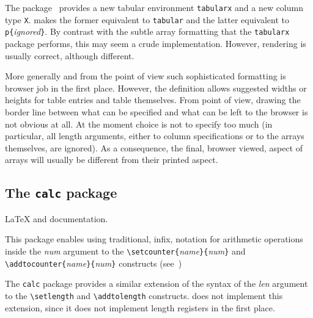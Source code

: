 The 
package~\cite[Section~5.3.5]{latexbis} provides a new tabular
environment \verb+tabularx+ and a new column type \verb+X+. \hevea{}
makes the former equivalent to \verb+tabular+ and the latter
equivalent to \verb+p{+\textit{ignored}\verb+}+.  By contrast with the
subtle array formatting that the \texttt{tabularx} package performs,
this may seem a crude implementation.  However, rendering is usually
correct, although different.

More generally and from the \html{} point of view such sophisticated
formatting is browser job in the first place.
However, the \html{} definition allows suggested widths or heights for
table entries and table themselves.
From \hevea{} point of view, drawing the border line between what can be
specified and what can be left to the browser is not obvious at all.
At the moment \hevea{} choice is not to specify too much (in
particular, all length
arguments, either to column specifications or to the arrays
themselves, are ignored). As a consequence, the final, browser viewed,
aspect of arrays will usually be different from their printed
aspect.

\subsection{The \texttt{calc}\label{calc} package}
%
\LaTeX{}  and documentation.

This package enables using traditional, infix, notation for
arithmetic operations
inside the \textit{num} argument to the
\verb+\setcounter{+\textit{name}\verb+}{+\textit{num}\verb+}+
and \verb+\addtocounter{+\textit{name}\verb+}{+\textit{num}\verb+}+
constructs (see~\cite[Section~A.4]{latexbis})

The \texttt{calc} package provides a similar extension of the syntax
of the \textit{len} argument to the \verb+\setlength+ and
\verb+\addtolength+ constructs.
\hevea{} does not implement this extension, since it does not
implement length registers in the first place.

